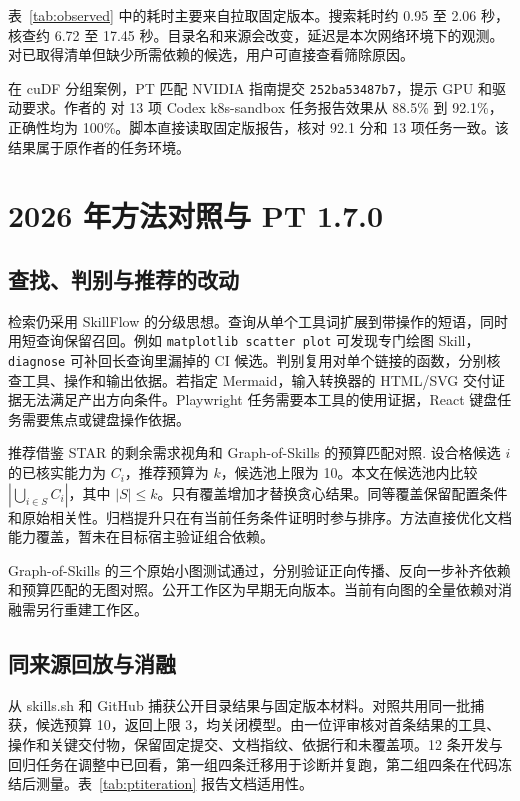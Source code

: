 \documentclass[final,5p,twocolumn,10pt]{elsarticle}
\begin{document}
表~\ref{tab:observed} 中的耗时主要来自拉取固定版本。搜索耗时约 0.95 至 2.06 秒，核查约 6.72 至 17.45 秒。目录名和来源会改变，延迟是本次网络环境下的观测。对已取得清单但缺少所需依赖的候选，用户可直接查看筛除原因。

在 cuDF 分组案例，PT 匹配 NVIDIA 指南提交 \texttt{252ba53487b7}，提示 GPU 和驱动要求。作者的  对 13 项 Codex k8s-sandbox 任务报告效果从 88.5\% 到 92.1\%，正确性均为 100\%。脚本直接读取固定版报告，核对 92.1 分和 13 项任务一致\cite{nvidia}。该结果属于原作者的任务环境。

\section{2026 年方法对照与 PT 1.7.0}

\subsection{查找、判别与推荐的改动}

检索仍采用 SkillFlow 的分级思想\cite{skillflow}。查询从单个工具词扩展到带操作的短语，同时用短查询保留召回。例如 \texttt{matplotlib scatter plot} 可发现专门绘图 Skill，\texttt{diagnose} 可补回长查询里漏掉的 CI 候选。判别复用对单个链接的函数，分别核查工具、操作和输出依据。若指定 Mermaid，输入转换器的 HTML/SVG 交付证据无法满足产出方向条件。Playwright 任务需要本工具的使用证据，React 键盘任务需要焦点或键盘操作依据。

推荐借鉴 STAR 的剩余需求视角和 Graph-of-Skills 的预算匹配对照\cite{star,graph}. 设合格候选 $i$ 的已核实能力为 $C_i$，推荐预算为 $k$，候选池上限为 10。本文在候选池内比较 $|\bigcup_{i \in S} C_i|$，其中 $|S|\le k$。只有覆盖增加才替换贪心结果。同等覆盖保留配置条件和原始相关性。归档提升只在有当前任务条件证明时参与排序。方法直接优化文档能力覆盖，暂未在目标宿主验证组合依赖。

Graph-of-Skills 的三个原始小图测试通过，分别验证正向传播、反向一步补齐依赖和预算匹配的无图对照。公开工作区为早期无向版本。当前有向图的全量依赖对消融需另行重建工作区\cite{graphassets}。

\subsection{同来源回放与消融}

从 skills.sh 和 GitHub 捕获公开目录结果与固定版本材料。对照共用同一批捕获，候选预算 10，返回上限 3，均关闭模型。由一位评审核对首条结果的工具、操作和关键交付物，保留固定提交、文档指纹、依据行和未覆盖项。12 条开发与回归任务在调整中已回看，第一组四条迁移用于诊断并复跑，第二组四条在代码冻结后测量。表~\ref{tab:ptiteration} 报告文档适用性。
\end{document}
